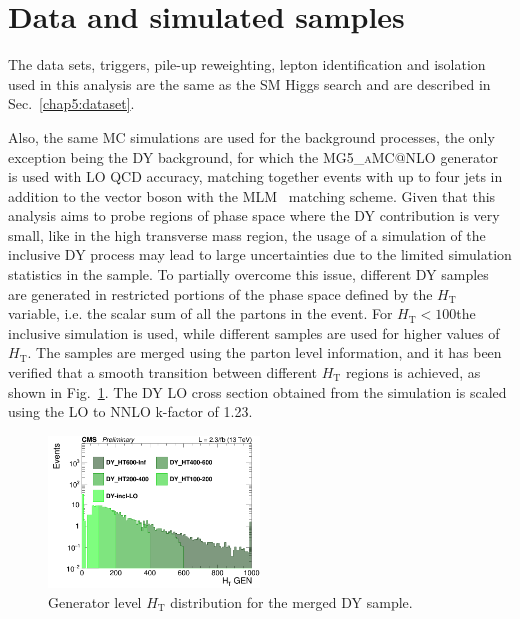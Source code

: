 \section{Data and simulated samples}\label{chap6:datatsets}

The data sets, triggers, pile-up reweighting, lepton identification and isolation used in this analysis are the same as the SM Higgs search and are described in Sec.~\ref{chap5:dataset}.

Also, the same MC simulations are used for the background processes, the only exception being the DY background, for which the \textsc{MG5\_aMC@NLO} generator is used with LO QCD accuracy, matching together events with up to four jets in addition to the vector boson with the MLM~\cite{Alwall:2007fs} matching scheme. Given that this analysis aims to probe regions of phase space where the DY contribution is very small, like in the high transverse mass region, the usage of a simulation of the inclusive DY process may lead to large uncertainties due to the limited simulation statistics in the sample. To partially overcome this issue, different DY samples are generated in restricted portions of the phase space defined by the $H_\mathrm{T}$ variable, i.e. the scalar sum of all the partons \pt in the event. For $H_\mathrm{T}< 100$\GeV the inclusive simulation is used, while different samples are used for higher values of $H_\mathrm{T}$. The samples are merged using the parton level information, and it has been verified that a smooth transition between different $H_\mathrm{T}$ regions is achieved, as shown in Fig.~\ref{fig:DY_HT}.
The DY LO cross section obtained from the simulation is scaled using the LO to NNLO k-factor of 1.23.

\begin{figure}[htbp]
\centering
\includegraphics[width=0.5\textwidth]{images/13TeV/log_c_incl_HTGen.png}
\caption{
    Generator level $H_\mathrm{T}$ distribution for the merged DY sample.}
    \label{fig:DY_HT}
\end{figure}

